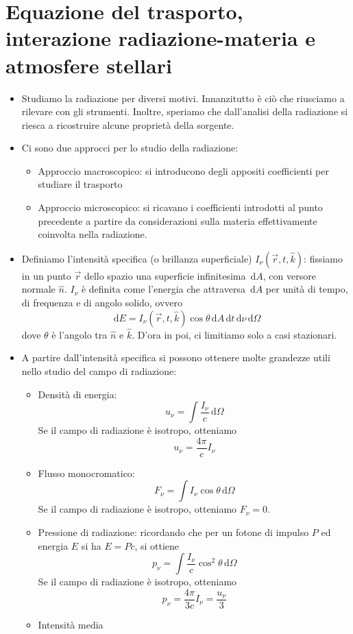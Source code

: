 \documentclass[a4paper,11pt]{article}
\renewcommand{\d}{\mathrm{d}} %
\renewcommand{\d}{\,\mathrm{d}}
\theoremstyle{theorem}
\theoremstyle{definition}
\begin{document}
	\section{Equazione del trasporto, interazione radiazione-materia e atmosfere stellari}
	\begin{itemize}
		\item Studiamo la radiazione per diversi motivi. Innanzitutto è ciò che riusciamo a rilevare con gli strumenti. Inoltre, speriamo che dall'analisi della radiazione si riesca a ricostruire alcune proprietà della sorgente.
		\item Ci sono due approcci per lo studio della radiazione:
		\begin{itemize}
			\item Approccio macroscopico: si introducono degli appositi coefficienti per studiare il trasporto
			\item Approccio microscopico: si ricavano i coefficienti introdotti al punto precedente a partire da considerazioni sulla materia effettivamente coinvolta nella radiazione.
		\end{itemize}
		\item Definiamo l'intensità specifica (o brillanza superficiale) $I_\nu(\vec{r},t,\hat{k})$: fissiamo in un punto $\vec{r}$ dello spazio una superficie infinitesima $\d A$, con versore normale $\hat{n}$. $I_\nu$ è definita come l'energia che attraversa $\d A$ per unità di tempo, di frequenza e di angolo solido, ovvero
		\[\d E=I_\nu(\vec{r},t,\hat{k})\cos\theta\d A\d t\d \nu\d\Omega\]
		dove $\theta$ è l'angolo tra $\hat{n}$ e $\hat{k}$. D'ora in poi, ci limitiamo solo a casi stazionari. 
		\item A partire dall'intensità specifica si possono ottenere molte grandezze utili nello studio del campo di radiazione:
		\begin{itemize}
			\item Densità di energia:
			\[u_\nu=\int\frac{I_\nu}{c}\d\Omega\]
			Se il campo di radiazione è isotropo, otteniamo
			\[u_\nu=\frac{4\pi}{c}I_\nu\]
			\item Flusso monocromatico:
			\[F_\nu=\int I_\nu\cos\theta\d\Omega\]
			Se il campo di radiazione è isotropo, otteniamo $F_\nu=0$.
			\item Pressione di radiazione: ricordando che per un fotone di impulso $P$ ed energia $E$ si ha $E=Pc$, si ottiene
			\[p_\nu=\int\frac{I_\nu}{c}\cos^2\theta\d\Omega\]
			Se il campo di radiazione è isotropo, otteniamo
			\[p_\nu=\frac{4\pi}{3c}I_\nu=\frac{u_\nu}{3}\]
			\item Intensità media

\end{itemize}
\end{itemize}
\end{document}
